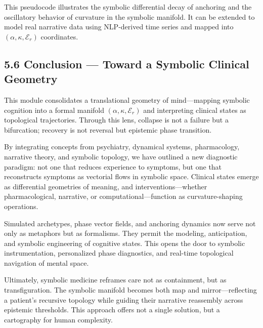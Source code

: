 This pseudocode illustrates the symbolic differential decay of anchoring and the oscillatory behavior of curvature in the symbolic manifold. It can be extended to model real narrative data using NLP-derived time series and mapped into $(\alpha, \kappa, \mathcal{E}_r)$ coordinates.

\subsection*{5.6 Conclusion — Toward a Symbolic Clinical Geometry}

This module consolidates a translational geometry of mind—mapping symbolic cognition into a formal manifold $(\alpha, \kappa, \mathcal{E}_r)$ and interpreting clinical states as topological trajectories. Through this lens, collapse is not a failure but a bifurcation; recovery is not reversal but epistemic phase transition.

By integrating concepts from psychiatry, dynamical systems, pharmacology, narrative theory, and symbolic topology, we have outlined a new diagnostic paradigm: not one that reduces experience to symptoms, but one that reconstructs symptoms as vectorial flows in symbolic space. Clinical states emerge as differential geometries of meaning, and interventions—whether pharmacological, narrative, or computational—function as curvature-shaping operations.

Simulated archetypes, phase vector fields, and anchoring dynamics now serve not only as metaphors but as formalisms. They permit the modeling, anticipation, and symbolic engineering of cognitive states. This opens the door to symbolic instrumentation, personalized phase diagnostics, and real-time topological navigation of mental space.

Ultimately, symbolic medicine reframes care not as containment, but as transfiguration. The symbolic manifold becomes both map and mirror—reflecting a patient’s recursive topology while guiding their narrative reassembly across epistemic thresholds. This approach offers not a single solution, but a cartography for human complexity.